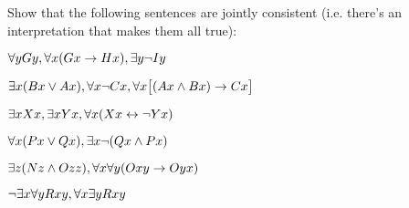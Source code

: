 \problempart
Show that the following sentences are jointly consistent (i.e. there's an interpretation that makes them all true):
\begin{earg}
\item $\forall y Gy, \forall x (Gx \rightarrow Hx), \exists y \neg Iy$
\item $\exists x(Bx \vee Ax), \forall x \neg Cx, \forall x\bigl[(Ax \wedge Bx) \rightarrow Cx\bigr]$
\item $\exists x Xx, \exists x Yx, \forall x(Xx \leftrightarrow \neg Yx)$
\item $\forall x(Px \vee Qx), \exists x\neg(Qx \wedge Px)$
\item $\exists z(Nz \wedge Ozz), \forall x\forall y(Oxy \rightarrow Oyx)$
\item $\neg \exists x \forall y Rxy, \forall x \exists y Rxy$
\end{earg}


